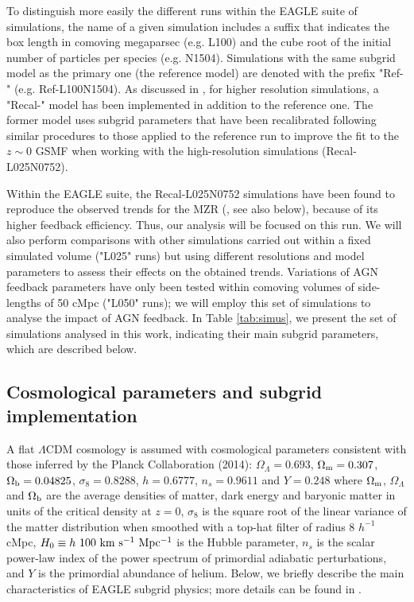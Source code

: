 \documentclass[useAMS,usenatbib]{mn2e}
\begin{document}
To distinguish more easily the different runs within the {\sc EAGLE} suite of simulations, 
the name of a given simulation includes
a suffix that indicates the box length in comoving megaparsec (e.g. L100)
and the cube root of the initial number of particles per species (e.g. N1504).
Simulations with the same subgrid model as the primary one (the reference model) are
denoted with the prefix "Ref-" (e.g. Ref-L100N1504).  As discussed in \citet{schaye2015}, for higher resolution
simulations, a "Recal-" model has been implemented in addition to the reference one.
The former model uses subgrid parameters that have been recalibrated
following similar procedures to those applied to the reference run to improve the fit to
the $z\sim0$ GSMF when working with the high-resolution simulations
(Recal-L025N0752).

Within the {\sc EAGLE} suite, the Recal-L025N0752 simulations have been found to
reproduce the observed trends for the MZR (\citealt{schaye2015}, see also below), because
of its higher feedback efficiency.  Thus, our analysis will be focused on this run. 
We will also perform comparisons with other simulations carried out within a fixed simulated volume
("L025" runs) but using different resolutions and model parameters to assess their effects 
on the obtained trends.  
Variations of AGN feedback
parameters have only been tested within comoving volumes of side-lengths of 50 cMpc
("L050" runs); we will employ this set of simulations to analyse the impact of AGN feedback. 
In Table \ref{tab:simus}, we present the set of simulations analysed in this work, indicating
their main subgrid parameters, which are described below.



\subsection{Cosmological parameters and subgrid implementation}
\label{sec:simulation_details}

A flat $\Lambda$CDM cosmology is assumed with cosmological parameters consistent
with those inferred by the Planck Collaboration (2014):
${\Omega}_{\Lambda} = 0.693$, ${\Omega}_{\rm m} = 0.307$, ${\Omega}_{\rm b} = 0.04825$,
${\sigma}_8 = 0.8288$, $h = 0.6777$, $n_{s} = 0.9611$ and $Y=0.248$ where 
${\Omega}_{\rm m}$, ${\Omega}_{\Lambda}$ and ${\Omega}_{\rm b}$ are the average densities of matter, dark
energy and baryonic matter in units of the critical density at $z=0$, 
${\sigma}_8$ is the square root of the
linear variance of the matter distribution when smoothed with a top-hat filter of radius 8 $h^{-1}$ cMpc,
$H_0 \equiv h \ 100 \ {\rm km \ s^{-1} \ Mpc^{-1}}$ is the Hubble parameter, 
$n_{s}$ is the scalar power-law index of the power spectrum of primordial adiabatic perturbations,
and $Y$ is the primordial abundance of helium.
Below, we briefly describe the main characteristics of {\sc EAGLE} subgrid physics; more details can
be found in \citet{schaye2015}.
\end{document}
